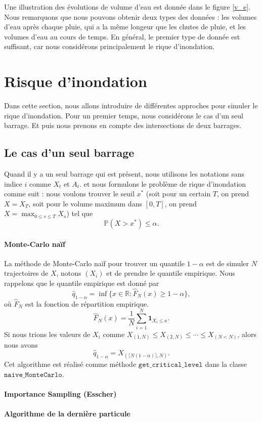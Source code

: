 \documentclass{article}
\begin{document}
Une illustration des évolutions de volume d'eau est donnée dans le figure \ref{v_e}. Nous remarquons que nous pouvons obtenir deux types des données : les volumes d'eau après chaque pluie, qui a la même longeur que les chutes de pluie, et les volumes d'eau au cours de temps. En général, le premier type de donnée est suffisant, car nous considérons principalement le rique d'inondation.

\section{Risque d'inondation}
Dans cette section, nous allons introduire de différentes approches pour simuler le rique d'inondation. Pour un premier temps, nous considérons le cas d'un seul barrage. Et puis nous prenons en compte des intersections de deux barrages.
\subsection{Le cas d'un seul barrage}
Quand il y a un seul barrage qui est présent, nous utilisons les notations sans indice $i$ comme $X_t$ et $A_t$. et nous formulons le problème de rique d'inondation comme suit : nous voulons trouver le seuil $x^\ast$ (soit pour un certain $T$, on prend $X=X_T$, soit pour le volume maximum dans $[0,T]$, on prend $X=\max_{0\le s\le T}X_s$) tel que
\[\mathbb{P}(X>x^\ast)\leq \alpha.\]
\paragraph{Monte-Carlo naïf} La méthode de Monte-Carlo naïf pour trouver un quantile $1-\alpha$ est de simuler $N$ trajectoires de $X$, notons $(X_i)$ et de prendre le quantile empirique. Nous rappelons que le quantile empirique est donné par
\[\hat{q}_{1-\alpha} = \inf\{x\in \mathbb{R}:\hat{F}_N(x)\geq 1-\alpha\},\]
où $\hat{F}_N$ est la fonction de répartition empirique. 
\[ \hat{F}_N(x) = \frac{1}{N}\sum_{i=1}^N \mathbf{1}_{X_i\leq x}.\]
Si nous trions les valeurs de $X_i$ comme $X_{(1,N)}\leq X_{(2,N)}\leq \cdots \leq X_{(N<N)}$, alors nous avons
\[\hat{q}_{1-\alpha} = X_{(\lceil N(1-\alpha)\rceil,N)}.\]
Cet algorithme est réalisé comme méthode $\texttt{get\_critical\_level}$ dans la classe $\texttt{naive\_MonteCarlo}$.
\paragraph{Importance Sampling (Esscher)}
\paragraph{Algorithme de la dernière particule}
\end{document}
